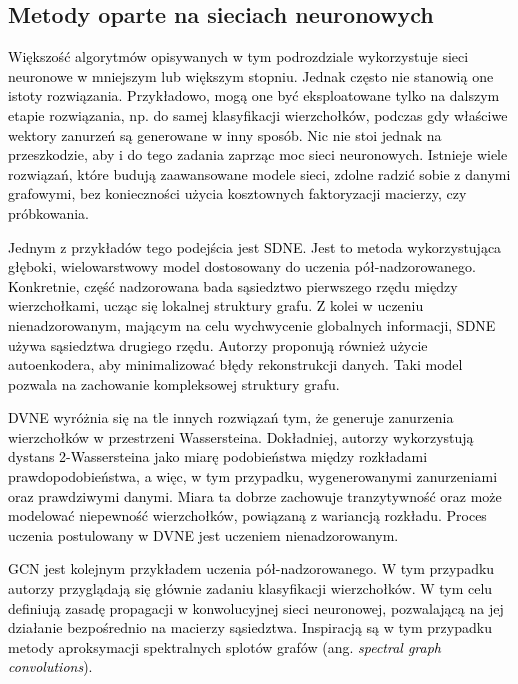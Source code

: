     \subsection{Metody oparte na sieciach neuronowych}
        \textcolor{black}{
        Większość algorytmów opisywanych w tym podrozdziale wykorzystuje sieci neuronowe w mniejszym lub większym stopniu. Jednak często nie stanowią one istoty rozwiązania. Przykładowo, mogą one być eksploatowane tylko na dalszym etapie rozwiązania, np. do samej klasyfikacji wierzchołków, podczas gdy właściwe wektory zanurzeń są generowane w inny sposób. Nic nie stoi jednak na przeszkodzie, aby i do tego zadania zaprząc moc sieci neuronowych. Istnieje wiele rozwiązań, które budują zaawansowane modele sieci, zdolne radzić sobie z danymi grafowymi, bez konieczności użycia kosztownych faktoryzacji macierzy, czy próbkowania.}

        \textcolor{black}{
        Jednym z przykładów tego podejścia jest SDNE\cite{Wang_Cui_Zhu_2016}. Jest to metoda wykorzystująca głęboki, wielowarstwowy model dostosowany do uczenia pół-nadzorowanego. Konkretnie, część nadzorowana bada sąsiedztwo pierwszego rzędu między wierzchołkami, ucząc się lokalnej struktury grafu. Z kolei w uczeniu nienadzorowanym, mającym na celu wychwycenie globalnych informacji, SDNE używa sąsiedztwa drugiego rzędu. Autorzy proponują również użycie autoenkodera, aby minimalizować błędy rekonstrukcji danych. Taki model pozwala na zachowanie kompleksowej struktury grafu.}
        
        \textcolor{black}{
        DVNE\cite{Zhu_Cui_Wang_Zhu_2018} wyróżnia się na tle innych rozwiązań tym, że generuje zanurzenia wierzchołków w przestrzeni Wassersteina. Dokładniej, autorzy wykorzystują dystans 2-Wassersteina jako miarę podobieństwa między rozkładami prawdopodobieństwa, a więc, w tym przypadku, wygenerowanymi zanurzeniami oraz prawdziwymi danymi. Miara ta dobrze zachowuje tranzytywność oraz może modelować niepewność wierzchołków, powiązaną z wariancją rozkładu. Proces uczenia postulowany w DVNE jest uczeniem nienadzorowanym.}
        
        \textcolor{black}{
        GCN\cite{DBLP:journals/corr/KipfW16} jest kolejnym przykładem uczenia pół-nadzorowanego. W tym przypadku autorzy przyglądają się głównie zadaniu klasyfikacji wierzchołków. W tym celu definiują zasadę propagacji w konwolucyjnej sieci neuronowej, pozwalającą na jej działanie bezpośrednio na macierzy sąsiedztwa. Inspiracją są w tym przypadku metody aproksymacji spektralnych splotów grafów (ang. \textit{spectral graph convolutions})\cite{Hammond_Vandergheynst_Gribonval_2011}.}
        
